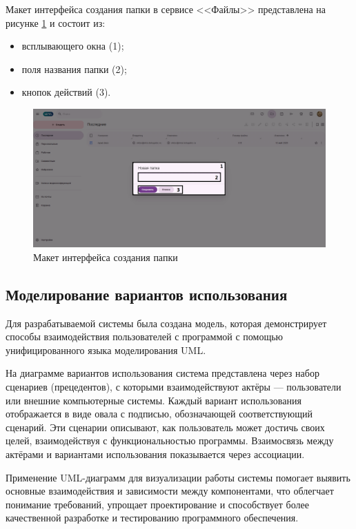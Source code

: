 Макет интерфейса создания папки в сервисе <<Файлы>> представлена на рисунке \ref{templ:image9d} и состоит из:
\begin{itemize}
  \item всплывающего окна (1);
  \item поля названия папки (2);
  \item кнопок действий (3).
\end{itemize}
\begin{figure}[H]
	\centering
	\includegraphics[width=1\linewidth]{images/файлы4}
	\caption{Макет интерфейса создания папки}
	\label{templ:image9d}
\end{figure}

\clearpage
\subsection{Моделирование вариантов использования}

Для разрабатываемой системы была создана модель, которая демонстрирует способы взаимодействия пользователей с программой с помощью унифицированного языка моделирования UML.

На диаграмме вариантов использования система представлена через набор сценариев (прецедентов), с которыми взаимодействуют актёры — пользователи или внешние компьютерные системы. Каждый вариант использования отображается в виде овала с подписью, обозначающей соответствующий сценарий. Эти сценарии описывают, как пользователь может достичь своих целей, взаимодействуя с функциональностью программы. Взаимосвязь между актёрами и вариантами использования показывается через ассоциации.

Применение UML-диаграмм для визуализации работы системы помогает выявить основные взаимодействия и зависимости между компонентами, что облегчает понимание требований, упрощает проектирование и способствует более качественной разработке и тестированию программного обеспечения.

